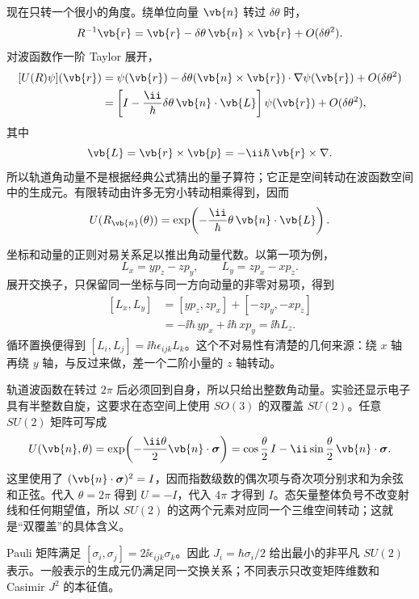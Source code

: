 现在只转一个很小的角度。绕单位向量 \(\vb{n}\) 转过
\(\delta\theta\) 时，
\[
R^{-1}\vb{r}
=\vb{r}-\delta\theta\,\vb{n}\times\vb{r}
+O(\delta\theta^2).
\]
对波函数作一阶 Taylor 展开，
\[
\begin{aligned}
[U(R)\psi](\vb{r})
&=\psi(\vb{r})
-\delta\theta(\vb{n}\times\vb{r})\cdot\nabla\psi(\vb{r})
+O(\delta\theta^2)\\
&=\left[I-\frac{\ii}{\hbar}\delta\theta\,
\vb{n}\cdot\vb{L}\right]\psi(\vb{r})
+O(\delta\theta^2),
\end{aligned}
\]
其中
\begin{equation}
\vb{L}=\vb{r}\times\vb{p}
=-\ii\hbar\,\vb{r}\times\nabla.
\label{eq:am-orbital-generator}
\end{equation}
所以轨道角动量不是根据经典公式猜出的量子算符；它正是空间转动在波函数空间中的生成元。有限转动由许多无穷小转动相乘得到，因而
\begin{equation}
U(R_{\vb{n}}(\theta))
=\exp\!\left(-\frac{\ii}{\hbar}\theta\,\vb{n}\cdot\vb{L}\right).
\label{eq:am-finite-rotation}
\end{equation}

坐标和动量的正则对易关系足以推出角动量代数。以第一项为例，
\[
L_x=y p_z-zp_y,
\qquad
L_y=z p_x-xp_z.
\]
展开交换子，只保留同一坐标与同一方向动量的非零对易项，得到
\[
\begin{aligned}
[L_x,L_y]
&=[yp_z,zp_x]+[-zp_y,-xp_z]\\
&=-\ii\hbar\,y p_x+\ii\hbar\,x p_y
=\ii\hbar L_z.
\end{aligned}
\]
循环置换便得到
\([L_i,L_j]=\ii\hbar\epsilon_{ijk}L_k\)。这个不对易性有清楚的几何来源：绕 \(x\) 轴再绕 \(y\) 轴，与反过来做，差一个二阶小量的 \(z\) 轴转动。

轨道波函数在转过 \(2\pi\) 后必须回到自身，所以只给出整数角动量。实验还显示电子具有半整数自旋，这要求在态空间上使用 \(SO(3)\) 的双覆盖 \(SU(2)\)。任意 \(SU(2)\) 矩阵可写成
\begin{equation}
U(\vb{n},\theta)
=\exp\!\left(-\frac{\ii\theta}{2}\vb{n}\cdot\boldsymbol\sigma\right)
=\cos\frac\theta2\,I
-\ii\sin\frac\theta2\,\vb{n}\cdot\boldsymbol\sigma.
\label{eq:am-su2-axis-angle}
\end{equation}
这里使用了
\((\vb{n}\cdot\boldsymbol\sigma)^2=I\)，因而指数级数的偶次项与奇次项分别求和为余弦和正弦。代入
\(\theta=2\pi\) 得到 \(U=-I\)，代入 \(4\pi\) 才得到 \(I\)。态矢量整体负号不改变射线和任何期望值，所以 \(SU(2)\) 的这两个元素对应同一个三维空间转动；这就是“双覆盖”的具体含义。

Pauli 矩阵满足
\([\sigma_i,\sigma_j]=2\ii\epsilon_{ijk}\sigma_k\)。因此
\(J_i=\hbar\sigma_i/2\) 给出最小的非平凡 \(SU(2)\) 表示。一般表示的生成元仍满足同一交换关系；不同表示只改变矩阵维数和 Casimir \(J^2\) 的本征值。

